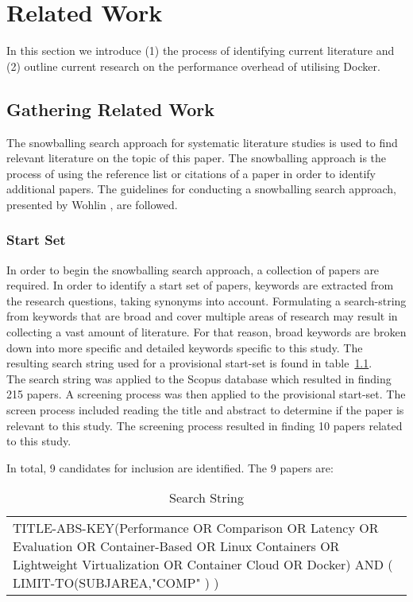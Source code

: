 \iffalse  \fi
\chapter{Related Work}
In this section we introduce (1) the process of identifying current literature and (2) outline current research on the performance overhead of utilising Docker.

\section{Gathering Related Work}
The snowballing search approach for systematic literature studies is used to find relevant literature on the topic of this paper. The snowballing approach is the process of using the reference list or citations of a paper in order to identify additional papers. The guidelines for conducting a snowballing search approach, presented by Wohlin \cite{Wohlin}, are followed. 

\subsection{Start Set}
In order to begin the snowballing search approach, a collection of papers are required. In order to identify a start set of papers, keywords are extracted from the research questions, taking synonyms into account. Formulating a search-string from keywords that are broad and cover multiple areas of research may result in collecting a vast amount of literature. For that reason, broad keywords are broken down into more specific and detailed keywords specific to this study. The resulting search string used for a provisional start-set is found in table~\ref{search-string}. \\


The search string was applied to the Scopus \cite{scopus} database which resulted in finding 215 papers. A screening process was then applied to the provisional start-set. The screen process included reading the title and abstract to determine if the paper is relevant to this study. The screening process resulted in finding 10 papers related to this study.

In total, 9 candidates for inclusion are identified. The 9 papers are:

\begin{table}[h]
\centering
\begin{tabular}{p{15cm}}
TITLE-ABS-KEY(Performance OR Comparison OR Latency OR Evaluation OR Container-Based OR Linux Containers OR Lightweight Virtualization OR Container Cloud OR Docker) AND ( LIMIT-TO(SUBJAREA,"COMP" ) )
\end{tabular}
\caption{Search String}
\label{search-string}
\end{table}

